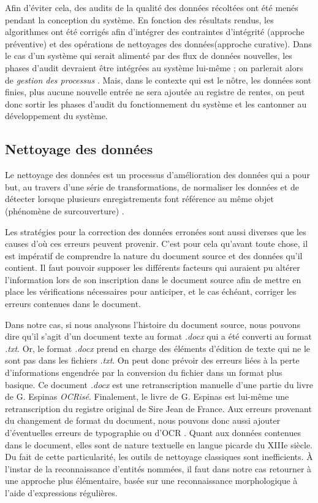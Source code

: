 Afin d'éviter cela, des audits de la qualité des données récoltées ont été menés pendant la conception du système. En fonction des résultats rendus, les algorithmes ont été corrigés afin d'intégrer des contraintes d'intégrité (approche préventive) et des opérations de nettoyages des données(approche curative).
Dans le cas d'un système qui serait alimenté par des flux de données nouvelles, les phases d'audit devraient être intégrées au système lui-même ; on parlerait alors de \textit{gestion des processus} \parencite{berti-equille_qualite_2004}. Mais, dans le contexte qui est le nôtre, les données sont finies, plus aucune nouvelle entrée ne sera ajoutée au registre de rentes, on peut donc sortir les phases d'audit du fonctionnement du système et les cantonner au développement du système.

\subsection{Nettoyage des données}
Le nettoyage des données est un processus d'amélioration des données qui a pour but, au travers d'une série de transformations, de normaliser les données et de détecter lorsque plusieurs enregistrements font référence au même objet (phénomène de surcouverture) \parencite{berti-equille_qualite_2004}.

Les stratégies pour la correction des données erronées sont aussi diverses que les causes d'où ces erreurs peuvent provenir. C'est pour cela qu'avant toute chose, il est impératif de comprendre la nature du document source et des données qu'il contient. Il faut pouvoir supposer les différents facteurs qui auraient pu altérer l'information lors de son inscription dans le document source afin de mettre en place les vérifications nécessaires pour anticiper, et le cas échéant, corriger les erreurs contenues dans le document.

Dans notre cas, si nous analysons \og l'histoire \fg{} du document source, nous pouvons dire qu'il s'agit d'un document texte au format \textit{.docx} qui  a été converti au format \textit{.txt}. Or, le format \textit{.docx} prend en charge des éléments d'édition de texte qui ne le sont pas dans les fichiers \textit{.txt}. On peut donc prévoir des erreurs liées à la perte d'informations engendrée par la conversion du fichier dans un format plus basique. 
Ce document \textit{.docx} est une retranscription manuelle d'une partie du livre de G. Espinas \textit{OCRisé}.
Finalement, le livre de G. Espinas est lui-même une retranscription du registre original de Sire Jean de France. Aux erreurs provenant du changement de format du document, nous pouvons donc aussi ajouter d'éventuelles erreurs de typographie ou d'OCR \parencite{berti-equille_qualite_2004}.
Quant aux données contenues dans le document, elles sont de nature textuelle en langue picarde du XIIIe siècle. Du fait de cette particularité, les outils de nettoyage classiques sont inefficients. À l’instar de la reconnaissance d'entités nommées, il faut dans notre cas retourner à une approche plus élémentaire, basée sur une reconnaissance morphologique à l'aide d'expressions régulières. 

